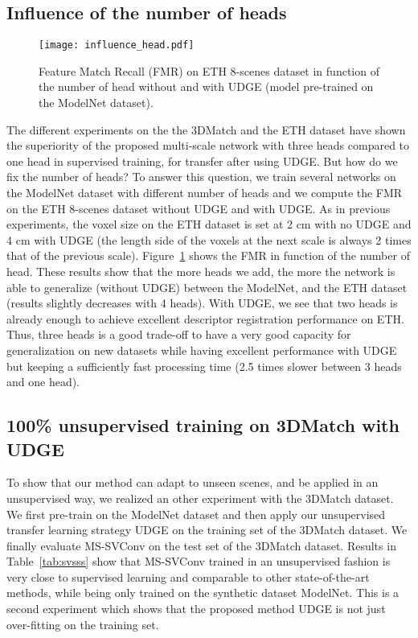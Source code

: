 \documentclass[10pt,twocolumn,letterpaper]{article}
\begin{document}
\subsection{Influence of the number of heads}

\begin{figure}
    \centering
    \texttt{[image: influence\_head.pdf]}
    \caption{Feature Match Recall (FMR) on ETH 8-scenes dataset in function of the number of head without and with UDGE (model pre-trained on the ModelNet dataset).}
    \label{fig:influence_head}
\end{figure}

The different experiments on the the 3DMatch and the ETH dataset have shown the superiority of the proposed multi-scale network with three heads compared to one head in supervised training, for transfer after using UDGE. But how do we fix the number of heads? To answer this question, we train several networks on the ModelNet dataset with different number of heads and we compute the FMR on the ETH 8-scenes dataset without UDGE and with UDGE. As in previous experiments, the voxel size on the ETH dataset is set at 2 cm with no UDGE and 4 cm with UDGE (the length side of the voxels at the next scale is always 2 times that of the previous scale).
Figure~\ref{fig:influence_head} shows the FMR in function of the number of head. These results show that the more heads we add, the more the network is able to generalize (without UDGE) between the ModelNet, and the ETH dataset (results slightly decreases with 4 heads). With UDGE, we see that two heads is already enough to achieve excellent descriptor registration performance on ETH. Thus, three heads is a good trade-off to have a very good capacity for generalization on new datasets while having excellent performance with UDGE but keeping a sufficiently fast processing time (2.5 times slower between 3 heads and one head).







\subsection{100\% unsupervised training on 3DMatch with UDGE}
To show that our method can adapt to unseen scenes, and be applied in an unsupervised way, we realized an other experiment with the 3DMatch dataset. We first pre-train on the ModelNet dataset and then apply our unsupervised transfer learning strategy UDGE on the training set of the 3DMatch dataset. We finally evaluate MS-SVConv on the test set of the 3DMatch dataset.
Results in Table~\ref{tab:svsss} show that MS-SVConv trained in an unsupervised fashion is very close to supervised learning and comparable to other state-of-the-art methods, while being only trained on the synthetic dataset ModelNet. This is a second experiment which shows that the proposed method UDGE is not just over-fitting on the training set. 
\end{document}
